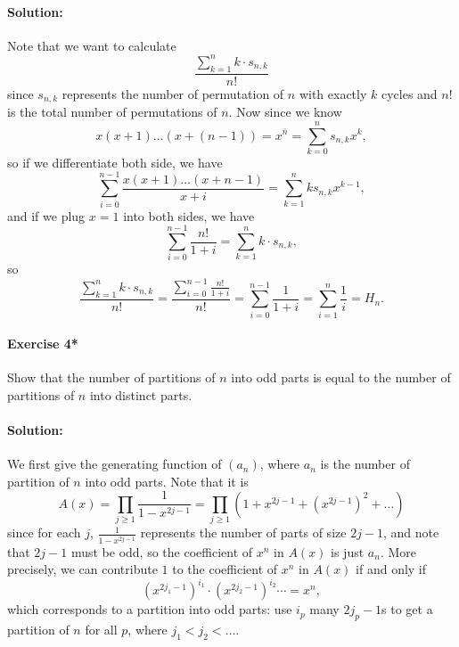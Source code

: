 \documentclass[a4paper,12pt]{article}
\begin{document}
\paragraph{Solution:} Note that we want to calculate 
\[
	\frac{\sum_{k=1}^{n} k \cdot s_{n, k} }{n!}
\] since \(s_{n, k}\) represents the number of permutation of \(n\) with exactly \(k\) cycles and \(n!\) is the total number of permutations of \(n\). Now since we know 
\[
	x(x+1)\dots (x+(n-1)) = x^{\overline{n}} = \sum_{k=0}^n s_{n, k} x^k,
\] so if we differentiate both side, we have 
\[
	\sum_{i=0}^{n-1} \frac{x(x+1)\dots (x+n-1)}{x+i} = \sum_{k=1}^n k s_{n, k} x^{k-1},  
\] and if we plug \(x=1\) into both sides, we have 
\[
	\sum_{i=0}^{n-1} \frac{n!}{1+i} = \sum_{k=1}^n k \cdot s_{n, k},  
\] so 
\[
	\frac{\sum_{k=1}^n k \cdot s_{n,k} }{n!} = \frac{\sum_{i=0}^{n-1} \frac{n!}{1+i} }{n!} = \sum_{i=0}^{n-1} \frac{1}{1+i} = \sum_{i=1}^n \frac{1}{i} = H_n.  
\]


\paragraph{Exercise 4*}  Show that the number of partitions of $n$ into odd parts is equal to the number of partitions of $n$ into distinct parts.
\vspace{-1em}
\paragraph{Solution:} We first give the generating function of \((a_n)\), where \(a_n\) is the number of partition of \(n\) into odd parts. Note that it is 
\[
	A(x) = \prod _{j \ge 1} \frac{1}{1 - x^{2j - 1}} = \prod _{j \ge 1} \left( 1 + x^{2j - 1} + \left( x^{2j - 1} \right)^2 + \dots \right) 
\] since for each \(j\), \(\frac{1}{1 - x^{2j - 1}}\) represents the number of parts of size \(2j - 1\), and note that \(2j - 1\) must be odd, so the coefficient of \(x^n\) in \(A(x)\) is just \(a_n\). More precisely, we can contribute \(1\) to the coefficient of \(x^n\) in \(A(x)\) if and only if 
\[
	\left( x^{2 j_1 - 1} \right)^{i_1} \cdot \left( x^{2j_2 - 1} \right)^{i_2} \cdots = x^n,
\] which corresponds to a partition into odd parts: use \(i_p\) many \(2j_p - 1\)s to get a partition of \(n\) for all \(p\), where \(j_1 < j_2 < \dots \).   
\end{document}
